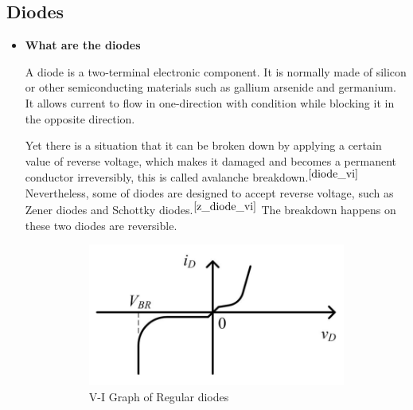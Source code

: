     \subsection{Diodes}
    \FloatBarrier
        \begin{itemize}
            \item \textbf{What are the diodes}\par
                A diode is a two-terminal electronic component. It is normally made of silicon or other semiconducting materials such as gallium arsenide and germanium. It allows current to flow in one-direction with condition while blocking it in the opposite direction.\par
                Yet there is a situation that it can be broken down by applying a certain value of reverse voltage, which makes it damaged and becomes a permanent conductor irreversibly, this is called avalanche breakdown.$^{\ref{diode_vi}}$ Nevertheless, some of diodes are designed to accept reverse voltage, such as Zener diodes and Schottky diodes.$^{\ref{z_diode_vi}}$ The breakdown happens on these two diodes are reversible. \par
                \begin{figure}[h]
                    \centering
                    \begin{subfigure}[h]{0.45\textwidth}
                        \centering
                        \includegraphics[width=0.9\linewidth]{Lab01/Lab1_diode_vi.png}
                        \caption{V-I Graph of Regular diodes}
                        \label{diode_vi}
                    \end{subfigure}
                    \hfill
                    \begin{subfigure}[h]{0.45\textwidth}
                        \centering

\end{subfigure}
\end{figure}
\end{itemize}

